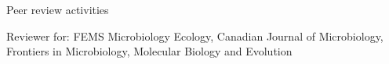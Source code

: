 \documentclass{resume} %
\begin{document}

\begin{rSection}{Peer review activities}

Reviewer for: FEMS Microbiology Ecology, Canadian Journal of Microbiology, Frontiers in Microbiology, Molecular Biology and Evolution 
\end{rSection}





\end{document}
